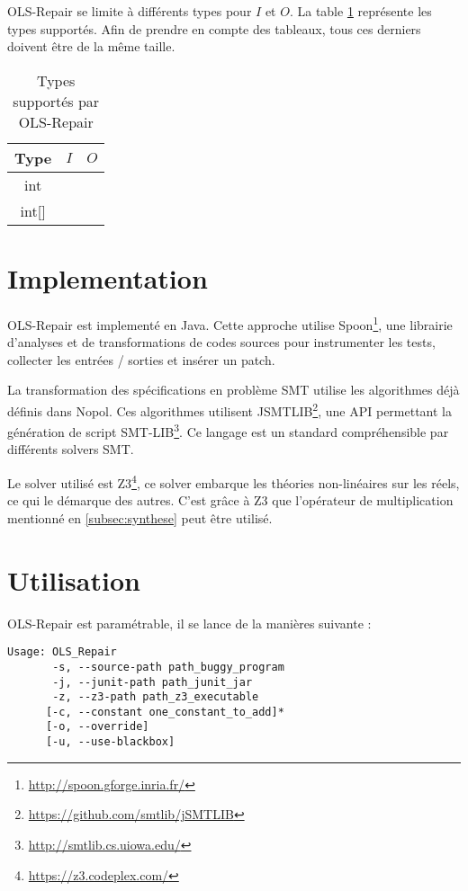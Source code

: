 OLS-Repair se limite à différents types pour $I$ et $O$. La table \ref{table:IO} représente les types supportés. Afin de  prendre en compte des tableaux, tous ces derniers doivent être de la même taille.

\begin{table}[H]
\centering
\begin{tabular}{|c|c|c|}
  \hline
  Type & $I$ & $O$ \\
  \hline
  int 		& \checkmark & \checkmark \\
  int[] 	& \checkmark & \ding{56} \\
  \hline
\end{tabular}

\caption{Types supportés par OLS-Repair}
\label{table:IO}
\end{table}


\section{Implementation}
\label{sec:implementation}

\par OLS-Repair est implementé en Java. Cette approche utilise Spoon\footnote{\url{http://spoon.gforge.inria.fr/}}, une librairie d'analyses et de transformations de codes sources pour instrumenter les tests, collecter les entrées / sorties et insérer un patch.
\par La transformation des spécifications en problème SMT utilise les algorithmes déjà définis dans Nopol\cite{nopol}. Ces algorithmes utilisent JSMTLIB\footnote{\url{https://github.com/smtlib/jSMTLIB}}, une API permettant la génération de script SMT-LIB\footnote{\url{http://smtlib.cs.uiowa.edu/}}. Ce langage est un standard compréhensible par différents solvers SMT.
\par Le solver utilisé est Z3\footnote{\url{https://z3.codeplex.com/}}, ce solver embarque les théories non-linéaires sur les réels, ce qui le démarque des autres. C'est grâce à Z3 que l'opérateur de multiplication mentionné en \ref{subsec:synthese} peut être utilisé.


\section{Utilisation}

OLS-Repair est paramétrable, il se lance de la manières suivante :
\\
\begin{verbatim}
Usage: OLS_Repair
       -s, --source-path path_buggy_program
       -j, --junit-path path_junit_jar
       -z, --z3-path path_z3_executable
      [-c, --constant one_constant_to_add]*
      [-o, --override]
      [-u, --use-blackbox]
\end{verbatim}


	

	
		
		
		